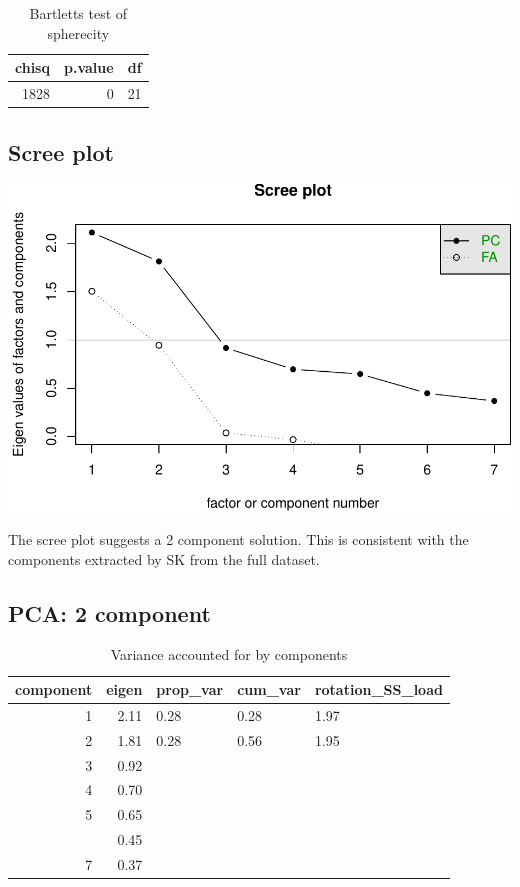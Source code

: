\documentclass[]{article}
\begin{document}
\begin{table}[H]

\caption{\label{tab:unnamed-chunk-44}Bartletts test of spherecity}
\centering
\fontsize{6}{8}\selectfont
\begin{tabular}[t]{rrr}
\toprule
chisq & p.value & df\\
\midrule
1828 & 0 & 21\\
\bottomrule
\end{tabular}
\end{table}

\hypertarget{scree-plot-8}{%
\subsection{Scree plot}\label{scree-plot-8}}

\includegraphics{PCA_covid_files/figure-latex/unnamed-chunk-45-1.pdf}

The scree plot suggests a 2 component solution. This is consistent with
the components extracted by SK from the full dataset.

\hypertarget{pca-2-component}{%
\subsection{PCA: 2 component}\label{pca-2-component}}

\begin{table}[H]

\caption{\label{tab:unnamed-chunk-46}Variance accounted for by components}
\centering
\fontsize{6}{8}\selectfont
\begin{tabular}[t]{rrlll}
\toprule
component & eigen & prop\_var & cum\_var & rotation\_SS\_load\\
\midrule
1 & 2.11 & 0.28 & 0.28 & 1.97\\
2 & 1.81 & 0.28 & 0.56 & 1.95\\
3 & 0.92 &  &  & \\
4 & 0.70 &  &  & \\
5 & 0.65 &  &  & \\
\addlinespace
6 & 0.45 &  &  & \\
7 & 0.37 &  &  & \\
\bottomrule
\end{tabular}
\end{table}
\end{document}
